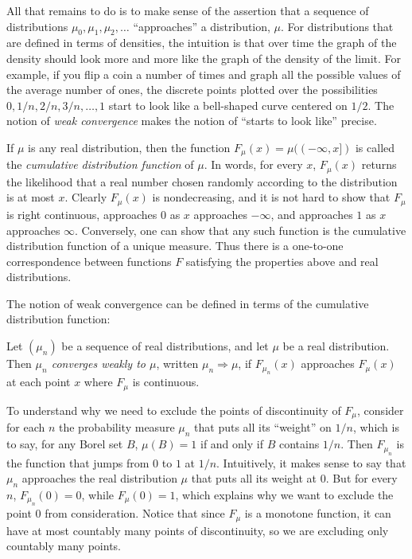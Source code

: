 \documentclass{svjour3}
\begin{document}
All that remains to do is to make sense of the assertion that a sequence of distributions $\mu_0, \mu_1, \mu_2, \ldots$ ``approaches'' a distribution, $\mu$. For distributions that are defined in terms of densities, the intuition is that over time the graph of the density should look more and more like the graph of the density of the limit. For example, if you flip a coin a number of times and graph all the possible values of the average number of ones, the discrete points plotted over the possibilities $0, 1/n, 2/n, 3/n, \ldots, 1$ start to look like a bell-shaped curve centered on $1 / 2$. The notion of \emph{weak convergence} makes the notion of ``starts to look like'' precise.

If $\mu$ is any real distribution, then the function $F_\mu(x) = \mu((-\infty, x])$ is called the \emph{cumulative distribution function} of $\mu$. In words, for every $x$, $F_\mu(x)$ returns the likelihood that a real number chosen randomly according to the distribution is at most $x$. Clearly $F_\mu(x)$ is nondecreasing, and it is not hard to show that $F_\mu$ is right continuous, approaches $0$ as $x$ approaches $-\infty$, and approaches $1$ as $x$ approaches $\infty$. Conversely, one can show that any such function is the cumulative distribution function of a unique measure. Thus there is a one-to-one correspondence between functions $F$ satisfying the properties above and real distributions.

The notion of weak convergence can be defined in terms of the cumulative distribution function:
\begin{definition}
 Let $(\mu_n)$ be a sequence of real distributions, and let $\mu$ be a real distribution. Then \emph{$\mu_n$ converges weakly to $\mu$}, written $\mu_n \Rightarrow \mu$, if $F_{\mu_n}(x)$ approaches $F_\mu(x)$ at each point $x$ where $F_\mu$ is continuous.
\end{definition}

To understand why we need to exclude the points of discontinuity of $F_\mu$, consider for each $n$ the probability measure $\mu_n$ that puts all its ``weight'' on $1 / n$, which is to say, for any Borel set $B$, $\mu(B) = 1$ if and only if $B$ contains $1 / n$. Then $F_{\mu_n}$ is the function that jumps from $0$ to $1$ at $1 / n$. Intuitively, it makes sense to say that $\mu_n$ approaches the real distribution $\mu$ that puts all its weight at $0$. But for every $n$, $F_{\mu_n}(0) = 0$, while $F_\mu(0) = 1$, which explains why we want to exclude the point $0$ from consideration. Notice that since $F_\mu$ is a monotone function, it can have at most countably many points of discontinuity, so we are excluding only countably many points.
\end{document}

